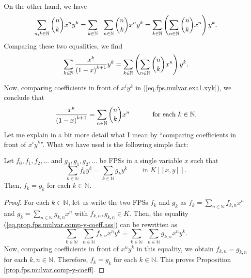 On the other hand, we have%
\[
\sum_{n,k\in\mathbb{N}}\dbinom{n}{k}x^{n}y^{k}=\sum_{k\in\mathbb{N}}%
\ \ \sum_{n\in\mathbb{N}}\dbinom{n}{k}x^{n}y^{k}=\sum_{k\in\mathbb{N}}\left(
\sum_{n\in\mathbb{N}}\dbinom{n}{k}x^{n}\right)  y^{k}.
\]
Comparing these two equalities, we find%
\begin{equation}
\sum_{k\in\mathbb{N}}\dfrac{x^{k}}{\left(  1-x\right)  ^{k+1}}y^{k}=\sum
_{k\in\mathbb{N}}\left(  \sum_{n\in\mathbb{N}}\dbinom{n}{k}x^{n}\right)
y^{k}. \label{eq.fps.mulvar.exa1.xyk}%
\end{equation}


Now, comparing coefficients in front of $x^{i}y^{k}$ in
(\ref{eq.fps.mulvar.exa1.xyk}), we conclude that%
\begin{equation}
\dfrac{x^{k}}{\left(  1-x\right)  ^{k+1}}=\sum_{n\in\mathbb{N}}\dbinom{n}%
{k}x^{n}\ \ \ \ \ \ \ \ \ \ \text{for each }k\in\mathbb{N}.
\label{eq.fps.mulvar.exa1.res1}%
\end{equation}
Let me explain in a bit more detail what I mean by \textquotedblleft comparing
coefficients in front of $x^{i}y^{k}$\textquotedblright. What we have used is
the following simple fact:

\begin{proposition}
\label{prop.fps.mulvar.comp-y-coeff}Let $f_{0},f_{1},f_{2},\ldots$ and
$g_{0},g_{1},g_{2},\ldots$ be FPSs in a single variable $x$ such that%
\begin{equation}
\sum_{k\in\mathbb{N}}f_{k}y^{k}=\sum_{k\in\mathbb{N}}g_{k}y^{k}%
\ \ \ \ \ \ \ \ \ \ \text{in }K\left[  \left[  x,y\right]  \right]  .
\label{eq.prop.fps.mulvar.comp-y-coeff.ass}%
\end{equation}
Then, $f_{k}=g_{k}$ for each $k\in\mathbb{N}$.
\end{proposition}

\begin{proof}
For each $k\in\mathbb{N}$, let us write the two FPSs $f_{k}$ and $g_{k}$ as
$f_{k}=\sum_{n\in\mathbb{N}}f_{k,n}x^{n}$ and $g_{k}=\sum_{n\in\mathbb{N}%
}g_{k,n}x^{n}$ with $f_{k,n},g_{k,n}\in K$. Then, the equality
(\ref{eq.prop.fps.mulvar.comp-y-coeff.ass}) can be rewritten as
\[
\sum_{k\in\mathbb{N}}\ \ \sum_{n\in\mathbb{N}}f_{k,n}x^{n}y^{k}=\sum
_{k\in\mathbb{N}}\ \ \sum_{n\in\mathbb{N}}g_{k,n}x^{n}y^{k}.
\]
Now, comparing coefficients in front of $x^{n}y^{k}$ in this equality, we
obtain $f_{k,n}=g_{k,n}$ for each $k,n\in\mathbb{N}$. Therefore, $f_{k}=g_{k}$
for each $k\in\mathbb{N}$. This proves Proposition
\ref{prop.fps.mulvar.comp-y-coeff}.
\end{proof}

